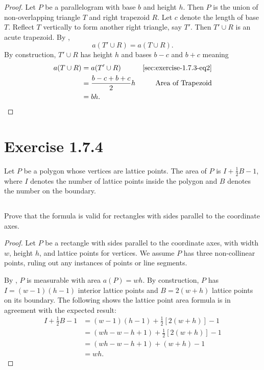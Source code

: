 \documentclass{report}
\begin{document}
\begin{proof}
  \suitdivider

  Let $P$ be a parallelogram with base $b$ and height $h$.
  Then $P$ is the union of non-overlapping triangle $T$ and right trapezoid $R$.
  Let $c$ denote the length of base $T$.
  Reflect $T$ vertically to form another right triangle, say $T'$.
  Then $T' \cup R$ is an acute trapezoid.
  By ,
    \begin{equation}
      \label{sec:exercise-1.7.3-eq2}
      \tag{3.2}
      a(T' \cup R) = a(T \cup R).
    \end{equation}
  By construction, $T' \cup R$ has height $h$ and bases $b - c$ and $b + c$
    meaning
    \begin{align*}
      a(T \cup R)
        & = a(T' \cup R) & \eqref{sec:exercise-1.7.3-eq2} \\
        & = \frac{b - c + b + c}{2}h & \text{Area of Trapezoid} \\
        & = bh.
    \end{align*}

\end{proof}

\section{Exercise 1.7.4}%
\label{sec:exercise-1.7.4}

Let $P$ be a polygon whose vertices are lattice points.
The area of $P$ is $I + \frac{1}{2}B - 1$, where $I$ denotes the number of
  lattice points inside the polygon and $B$ denotes the number on the boundary.

\subsection{}%
\label{sub:exercise-1.7.4a}

Prove that the formula is valid for rectangles with sides parallel to the
  coordinate axes.

\begin{proof}

  Let $P$ be a rectangle with sides parallel to the coordinate axes, with width
    $w$, height $h$, and lattice points for vertices.
  We assume $P$ has three non-collinear points, ruling out any instances of
    points or line segments.

  By , $P$ is measurable with area $a(P) = wh$.
  By construction, $P$ has $I = (w - 1)(h - 1)$ interior lattice points and
    $B = 2(w + h)$ lattice points on its boundary.
  The following shows the lattice point area formula is in agreement with
    the expected result:
    \begin{align*}
      I + \frac{1}{2}B - 1
        & = (w - 1)(h - 1) + \frac{1}{2}\left[ 2(w + h) \right] - 1 \\
        & = (wh - w - h + 1) + \frac{1}{2}\left[ 2(w + h) \right] - 1 \\
        & = (wh - w - h + 1) + (w + h) - 1 \\
        & = wh.
    \end{align*}

\end{proof}
\end{document}
